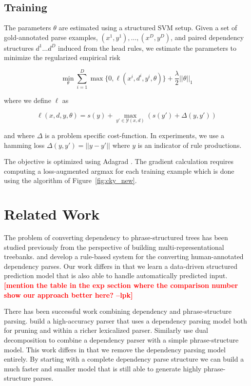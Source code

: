 \documentclass[11pt,letterpaper]{article}
\newcommand{\lpkcomment}[1]{\textcolor{red}{\bf \small [#1 --lpk]}}
\begin{document}
\subsection{Training}

The parameters $\theta$ are estimated using a structured SVM setup.
Given a set of gold-annotated parse examples, $(x^{1}, y^{1}), \ldots,
(x^{D}, y^{D})$, and paired dependency structures $d^{1} \ldots d^{D}$ induced
from the head rules, we estimate the
parameters to minimize the regularized empirical risk

\[ \min_{\theta} \sum_{i = 1}^D \max\{0,  \ell( x^{i}, d^{i} , y^{i}, \theta) \} + \frac{\lambda}{2} ||\theta||_1 \]

\noindent where we define $\ell$ as

\[\ell(x, d, y, \theta) = s(y) + \max_{y' \in \mathcal{Y}(x, d)}\left(s(y')  + \Delta(y, y') \right) \]

\noindent and where $\Delta$ is a problem specific cost-function.
In experiments, we use a hamming loss  $\Delta(y, y') = || y -y'||$ where $y$ is an indicator
of rule productions.

The objective is optimized using Adagrad \cite{duchi2011adaptive}.  The gradient
calculation requires computing a loss-augmented argmax for each
training example which is done using the algorithm of Figure~\ref{fig:cky_new}.


\section{Related Work}

The problem of converting dependency to phrase-structured trees has
been studied previously from the perspective of building
multi-representational treebanks.   and
 develop a rule-based system for the
converting human-annotated dependency parses. Our work differs in that
we learn a data-driven structured prediction model that is also able
to handle automatically predicted input.\lpkcomment{mention the table in the exp section where the comparison number show our approach better here?}

There has been successful work combining dependency and phrase-structure parsing.  build a
high-accuracy parser that uses a dependency parsing model both for
pruning and within a richer lexicalized parser. Similarly
 use dual decomposition to combine a dependency
parser with a simple phrase-structure model. This work differs
in that we remove the dependency parsing model entirely.
By starting with a complete dependency parse structure
we can build a much faster and smaller model that  is still
able to generate highly phrase-structure parses. 
\end{document}
